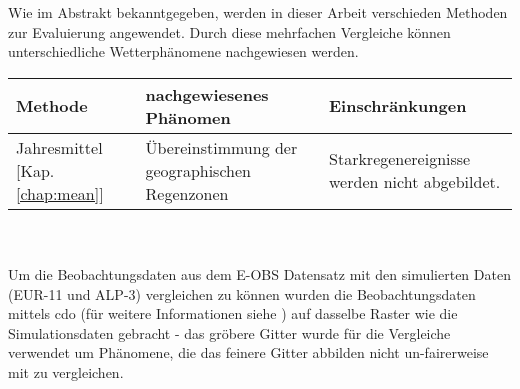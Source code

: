 Wie im Abstrakt bekanntgegeben, werden in dieser Arbeit verschieden Methoden zur Evaluierung angewendet. Durch diese mehrfachen Vergleiche können unterschiedliche Wetterphänomene nachgewiesen werden.\\

\begin{tabularx}{\textwidth}{|X|X|X|}
		\hline
		\textbf{Methode} & \textbf{nachgewiesenes Phänomen}& \textbf{Einschränkungen}\\
		\hline
		Jahresmittel [Kap. \ref{chap:mean}] & Übereinstimmung der geographischen Regenzonen & Starkregenereignisse werden nicht abgebildet.\\
		\hline
\end{tabularx}
\\ \hfill \\

Um die Beobachtungsdaten aus dem E-OBS Datensatz mit den simulierten Daten (EUR-11 und ALP-3) vergleichen zu können wurden die Beobachtungsdaten mittels cdo (für weitere Informationen siehe \cite{cdo}) auf dasselbe Raster wie die Simulationsdaten gebracht - das gröbere Gitter wurde für die Vergleiche verwendet um Phänomene, die das feinere Gitter abbilden nicht un-fairerweise mit zu vergleichen.
